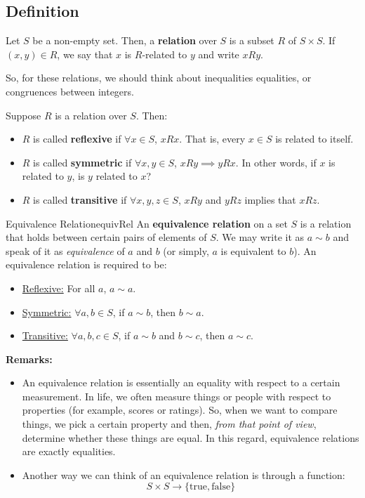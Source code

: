 \documentclass[letterpaper]{article}
\begin{document}
\subsection{Definition}
Let $S$ be a non-empty set. Then, a \textbf{relation} over $S$ is a subset $R$ of $S \times S$. If $(x, y) \in R$, we say that $x$ is $R$-related to $y$ and write $x R y$. 

\bigskip 

So, for these relations, we should think about inequalities equalities, or congruences between integers. 

\bigskip 

Suppose $R$ is a relation over $S$. Then:
\begin{itemize}
    \item $R$ is called \textbf{reflexive} if $\forall x \in S$, $x R x$. That is, every $x \in S$ is related to itself. 
    \item $R$ is called \textbf{symmetric} if $\forall x, y \in S$, $x R y \implies y R x$. In other words, if $x$ is related to $y$, is $y$ related to $x$? 
    \item $R$ is called \textbf{transitive} if $\forall x, y, z \in S$, $x R y$ and $y R z$ implies that $x R z$. 
\end{itemize}

\begin{definition}{Equivalence Relation}{equivRel}
    An \textbf{equivalence relation} on a set $S$ is a relation that holds between certain pairs of elements of $S$. We may write it as $a \sim b$ and speak of it as \emph{equivalence} of $a$ and $b$ (or simply, $a$ is equivalent to $b$). An equivalence relation is required to be: 
    \begin{itemize}
        \item \underline{Reflexive:} For all $a$, $a \sim a$. 
        \item \underline{Symmetric:} $\forall a, b \in S$, if $a \sim b$, then $b \sim a$. 
        \item \underline{Transitive:} $\forall a, b, c \in S$, if $a \sim b$ and $b \sim c$, then $a \sim c$. 
    \end{itemize}
\end{definition}

\textbf{Remarks:}
\begin{itemize}
    \item An equivalence relation is essentially an equality with respect to a certain measurement. In life, we often measure things or people with respect to properties (for example, scores or ratings). So, when we want to compare things, we pick a certain property and then, \emph{from that point of view}, determine whether these things are equal. In this regard, equivalence relations are exactly equalities. 
    \item Another way we can think of an equivalence relation is through a function: 
    \[S \times S \to \{\text{true}, \text{false}\}\]
\end{itemize} 
\end{document}
